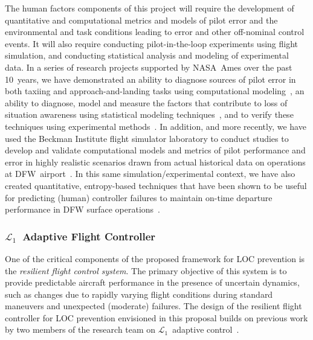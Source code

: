 \documentclass[letter,onecolumn,12pt]{aiaa-tc}
\newcommand{\Lone}{\mathcal{L}_1}
\begin{document}
The human factors components of this project will require the development of quantitative and computational metrics and models of pilot error and the environmental and task conditions leading to error and other off-nominal control events. It will also require conducting pilot-in-the-loop experiments using flight simulation, and conducting statistical analysis and modeling of experimental data. In a series of research projects supported by NASA~Ames over the past 10~years, we have demonstrated an ability to diagnose sources of pilot error in both taxiing and approach-and-landing tasks using computational modeling~\cite{byrne2005aviation,byrne2007aviation}, an ability to diagnose, model and measure the factors that contribute to loss of situation awareness using statistical modeling techniques~\cite{kirlik2006situation}, and to verify these techniques using experimental methods~\cite{strauss2006situation}. In addition, and more recently, we have used the Beckman Institute flight simulator laboratory to conduct studies to develop and validate computational models and metrics of pilot performance and error in highly realistic scenarios drawn from actual historical data on operations at DFW~airport~\cite{zelma2011ACTR}. In this same simulation/experimental context, we have also created quantitative, entropy-based techniques that have been shown to be useful for predicting (human) controller failures to maintain on-time departure performance in DFW surface operations~\cite{moehlenbrink2012entropy}.


\subsubsection{$\Lone~$ Adaptive Flight Controller}

One of the critical components of the proposed framework for LOC prevention is the \emph{resilient flight control system}. The primary objective of this system is to provide predictable aircraft performance in the presence of uncertain dynamics, such as changes due to rapidly varying flight conditions during standard maneuvers and unexpected (moderate) failures. The design of the resilient flight controller for LOC prevention envisioned in this proposal builds on previous work by two members of the research team on $\Lone$~adaptive control~\cite{L1book}.
\end{document}
